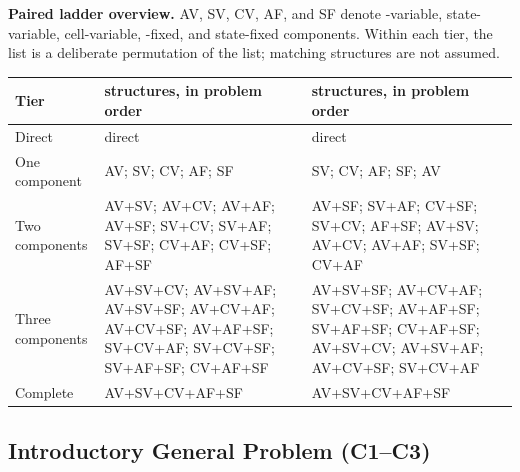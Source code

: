 \textbf{Paired ladder overview.} AV, SV, CV, AF, and SF denote
-variable, state-variable, cell-variable, -fixed, and
state-fixed components. Within each tier, the  list is a deliberate
permutation of the  list; matching structures are not assumed.

\begin{center}
	\small
	\begin{tabularx}{\textwidth}{@{}lXX@{}}
		\toprule
		Tier
		& \GTenToneHL{revenue}{Revenue} structures, in problem order
		& \GTenToneHL{cost}{Cost} structures, in problem order \\
		\midrule
		Direct
		& direct
		& direct \\
		
		One component
		& AV; SV; CV; AF; SF
		& SV; CV; AF; SF; AV \\
		
		Two components
		& AV+SV; AV+CV; AV+AF; AV+SF; SV+CV; SV+AF; SV+SF; CV+AF; CV+SF; AF+SF
		& AV+SF; SV+AF; CV+SF; SV+CV; AF+SF; AV+SV; AV+CV; AV+AF; SV+SF; CV+AF \\
		
		Three components
		& AV+SV+CV; AV+SV+AF; AV+SV+SF; AV+CV+AF; AV+CV+SF;
		AV+AF+SF; SV+CV+AF; SV+CV+SF; SV+AF+SF; CV+AF+SF
		& AV+SV+SF; AV+CV+AF; SV+CV+SF; AV+AF+SF; SV+AF+SF;
		CV+AF+SF; AV+SV+CV; AV+SV+AF; AV+CV+SF; SV+CV+AF \\
		
		Complete
		& AV+SV+CV+AF+SF
		& AV+SV+CV+AF+SF \\
		\bottomrule
	\end{tabularx}
\end{center}

\subsection{Introductory General Problem (C1--C3)}
\label{sec:problem1-introductory-general-c1-c3}

